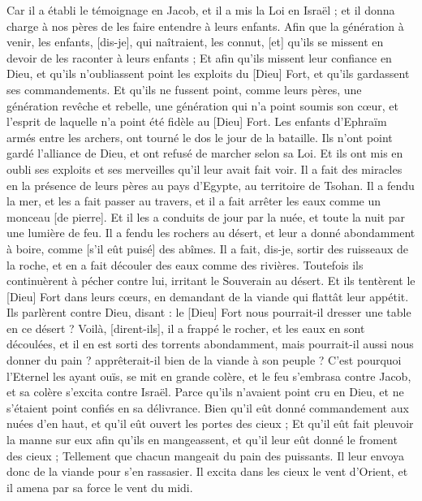\begin{multicols}{2}
Car il a établi le témoignage en Jacob, et il a mis la Loi en Israël ; et il donna charge à nos pères de les faire entendre à leurs enfants.
Afin que la génération à venir, les enfants, [dis-je], qui naîtraient, les connut, [et] qu'ils se missent en devoir de les raconter à leurs enfants ;
Et afin qu'ils missent leur confiance en Dieu, et qu'ils n'oubliassent point les exploits du [Dieu] Fort, et qu'ils gardassent ses commandements.
Et qu'ils ne fussent point, comme leurs pères, une génération revêche et rebelle, une génération qui n'a point soumis son cœur, et l'esprit de laquelle n'a point été fidèle au [Dieu] Fort.
Les enfants d'Ephraïm armés entre les archers, ont tourné le dos le jour de la bataille.
Ils n'ont point gardé l'alliance de Dieu, et ont refusé de marcher selon sa Loi.
Et ils ont mis en oubli ses exploits et ses merveilles qu'il leur avait fait voir.
Il a fait des miracles en la présence de leurs pères au pays d'Egypte, au territoire de Tsohan.
Il a fendu la mer, et les a fait passer au travers, et il a fait arrêter les eaux comme un monceau [de pierre].
Et il les a conduits de jour par la nuée, et toute la nuit par une lumière de feu.
Il a fendu les rochers au désert, et leur a donné abondamment à boire, comme [s'il eût puisé] des abîmes.
Il a fait, dis-je, sortir des ruisseaux de la roche, et en a fait découler des eaux comme des rivières.
Toutefois ils continuèrent à pécher contre lui, irritant le Souverain au désert.
Et ils tentèrent le [Dieu] Fort dans leurs cœurs, en demandant de la viande qui flattât leur appétit.
Ils parlèrent contre Dieu, disant : le [Dieu] Fort nous pourrait-il dresser une table en ce désert ?
Voilà, [dirent-ils], il a frappé le rocher, et les eaux en sont découlées, et il en est sorti des torrents abondamment, mais pourrait-il aussi nous donner du pain ? apprêterait-il bien de la viande à son peuple ?
C'est pourquoi l'Eternel les ayant ouïs, se mit en grande colère, et le feu s'embrasa contre Jacob, et sa colère s'excita contre Israël.
Parce qu'ils n'avaient point cru en Dieu, et ne s'étaient point confiés en sa délivrance.
Bien qu'il eût donné commandement aux nuées d'en haut, et qu'il eût ouvert les portes des cieux ;
Et qu'il eût fait pleuvoir la manne sur eux afin qu'ils en mangeassent, et qu'il leur eût donné le froment des cieux ;
Tellement que chacun mangeait du pain des puissants. Il leur envoya donc de la viande pour s'en rassasier.
Il excita dans les cieux le vent d'Orient, et il amena par sa force le vent du midi.

\end{multicols}
